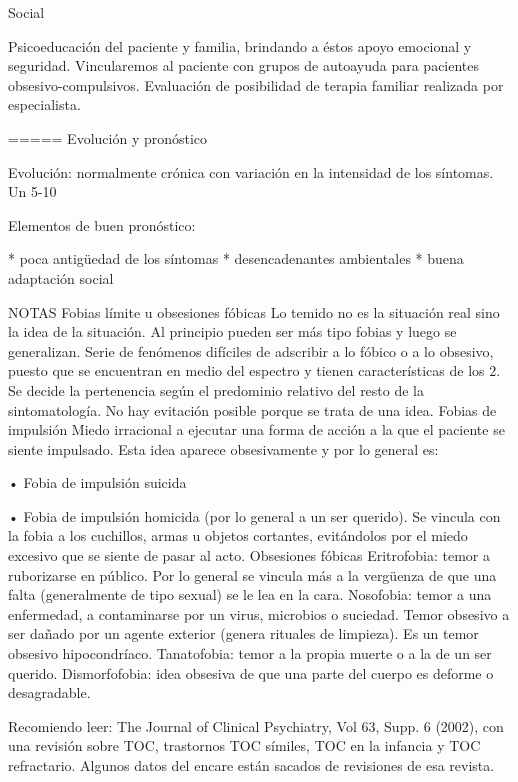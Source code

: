 \documentclass[encares.tex]{subfiles}
\begin{document}
Social

Psicoeducación del paciente y familia, brindando a éstos apoyo emocional y seguridad. Vincularemos al paciente con grupos de autoayuda para pacientes obsesivo-compulsivos. Evaluación de posibilidad de terapia familiar realizada por especialista.

===== Evolución y pronóstico

Evolución: normalmente crónica con variación en la intensidad de los síntomas. Un 5-10%

Elementos de buen pronóstico:

* poca antigüedad de los síntomas
* desencadenantes ambientales
* buena adaptación social

NOTAS Fobias límite u obsesiones fóbicas Lo temido no es la situación real sino la idea de la situación. Al principio pueden ser más tipo fobias y luego se generalizan. Serie de fenómenos difíciles de adscribir a lo fóbico o a lo obsesivo, puesto que se encuentran en medio del espectro y tienen características de los 2. Se decide la pertenencia según el predominio relativo del resto de la sintomatología. No hay evitación posible porque se trata de una idea. Fobias de impulsión Miedo irracional a ejecutar una forma de acción a la que el paciente se siente impulsado. Esta idea aparece obsesivamente y por lo general es:

• Fobia de impulsión suicida

• Fobia de impulsión homicida (por lo general a un ser querido). Se vincula con la fobia a los cuchillos, armas u objetos cortantes, evitándolos por el miedo excesivo que se siente de pasar al acto. Obsesiones fóbicas Eritrofobia: temor a ruborizarse en público. Por lo general se vincula más a la vergüenza de que una falta (generalmente de tipo sexual) se le lea en la cara. Nosofobia: temor a una enfermedad, a contaminarse por un virus, microbios o suciedad. Temor obsesivo a ser dañado por un agente exterior (genera rituales de limpieza). Es un temor obsesivo hipocondríaco. Tanatofobia: temor a la propia muerte o a la de un ser querido. Dismorfofobia: idea obsesiva de que una parte del cuerpo es deforme o desagradable.

Recomiendo leer: The Journal of Clinical Psychiatry, Vol 63, Supp. 6 (2002), con una revisión sobre TOC, trastornos TOC símiles, TOC en la infancia y TOC refractario. Algunos datos del encare están sacados de revisiones de esa revista.
\end{document}
